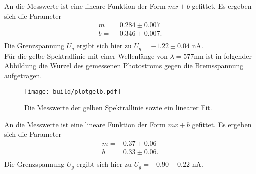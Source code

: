 An die Messwerte ist eine lineare Funktion der Form $mx +b$ gefittet. Es ergeben
sich die Parameter
\begin{align*}
  m = & 0.284 \pm 0.007 \\
  b = & 0.346 \pm 0.007.\\
\end{align*}
Die Grenzspannung $U_g$ ergibt sich hier zu $ U_g = -1.22 \pm 0.04$ \si{\nano\ampere}. \\
\noindent
Für die gelbe Spektrallinie mit einer Wellenlänge von $\lambda = 577 \si{\nano\meter}$
ist in folgender Abbildung die Wurzel des gemessenen Photostroms gegen die Bremsspannung
aufgetragen.
\begin{figure}[H]
  \centering
  \texttt{[image: build/plotgelb.pdf]}
  \label{fig:plotgelb}
  \caption{Die Messwerte der gelben Spektrallinie sowie ein linearer Fit.}
\end{figure}
\noindent
An die Messwerte ist eine lineare Funktion der Form $mx +b$ gefittet. Es ergeben sich die Parameter
\begin{align*}
  m = & 0.37 \pm 0.06 \\
  b = & 0.33 \pm 0.06.\\
\end{align*}
Die Grenzspannung $U_g$ ergibt sich hier zu $ U_g = -0.90 \pm 0.22$ \si{\nano\ampere}. \\

